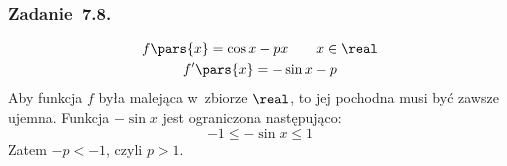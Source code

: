 \subsubsection*{Zadanie~7.8.}
\begin{gather*}
    f\pars{x} = \cos x - px \qquad x \in \real\\
    f'\pars{x} = -\sin x - p
\end{gather*}
Aby funkcja \(f\) była malejąca w~zbiorze \(\real\), to jej pochodna musi być zawsze ujemna. Funkcja \(-\sin x\) jest ograniczona następująco:
\begin{equation*}
    -1 \leq -\sin x \leq 1
\end{equation*}
Zatem \(-p < -1\), czyli \(p > 1\).

